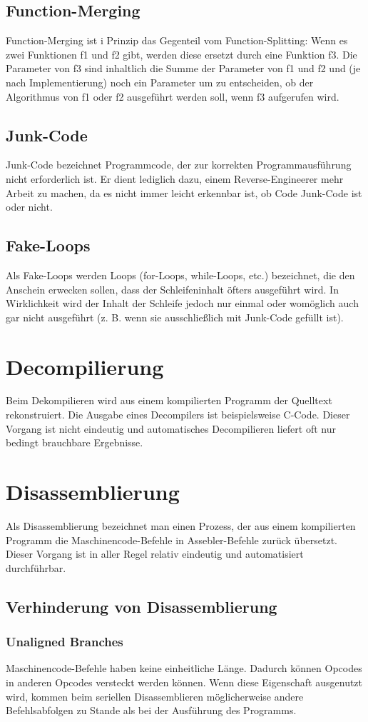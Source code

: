 \begin{multicols}{3}
\subsection{Function-Merging}
Function-Merging ist i Prinzip das Gegenteil vom Function-Splitting: Wenn es zwei Funktionen f1 und f2 gibt, werden diese ersetzt durch eine Funktion f3. Die Parameter von f3 sind inhaltlich die Summe der Parameter von f1 und f2 und (je nach Implementierung) noch ein Parameter um zu entscheiden, ob der Algorithmus von f1 oder f2 ausgeführt werden soll, wenn f3 aufgerufen wird.
\subsection{Junk-Code}
Junk-Code bezeichnet Programmcode, der zur korrekten Programmausführung nicht erforderlich ist. Er dient lediglich dazu, einem Reverse-Engineerer mehr Arbeit zu machen, da es nicht immer leicht erkennbar ist, ob Code Junk-Code ist oder nicht.
\subsection{Fake-Loops}
Als Fake-Loops werden Loops (for-Loops, while-Loops, etc.) bezeichnet, die den Anschein erwecken sollen, dass der Schleifeninhalt öfters ausgeführt wird. In Wirklichkeit wird der Inhalt der Schleife jedoch nur einmal oder womöglich auch gar nicht ausgeführt (z. B. wenn sie ausschließlich mit Junk-Code gefüllt ist).
\section{Decompilierung}
Beim Dekompilieren wird aus einem kompilierten Programm der Quelltext rekonstruiert. Die Ausgabe eines Decompilers ist beispielsweise C-Code. Dieser Vorgang ist nicht eindeutig und automatisches Decompilieren liefert oft nur bedingt brauchbare Ergebnisse.
\section{Disassemblierung}
Als Disassemblierung bezeichnet man einen Prozess, der aus einem kompilierten Programm die Maschinencode-Befehle in Assebler-Befehle zurück übersetzt. Dieser Vorgang ist in aller Regel relativ eindeutig und automatisiert durchführbar.
\subsection{Verhinderung von Disassemblierung}
\subsubsection{Unaligned Branches}
Maschinencode-Befehle haben keine einheitliche Länge. Dadurch können Opcodes in anderen Opcodes versteckt werden können. Wenn diese Eigenschaft ausgenutzt wird, kommen beim seriellen Disassemblieren möglicherweise andere Befehlsabfolgen zu Stande als bei der Ausführung des Programms. 

\end{multicols}
